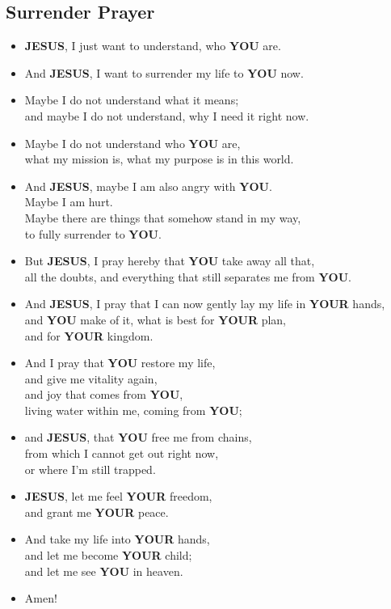 \documentclass[10pt,a5paper]{article}
\newcommand{\Jesus}[0]{\textbf{JESUS}}
\newcommand{\You}[0]{\textbf{YOU}}
\newcommand{\Your}[0]{\textbf{YOUR}}
\begin{document}
		\subsection{Surrender Prayer}
			\begin{itemize}[nosep]
				\item	{\Jesus},
						I just want to understand,
						who {\You} are.
				\item	And {\Jesus},
						I want to surrender my life to {\You} now.
				\item	Maybe I do not understand what it means;
						\\
						and maybe I do not understand,
						why I need it right now.
				\item	Maybe I do not understand who {\You} are,
						\\
						what my mission is,
						what my purpose is in this world.
				\item	And {\Jesus},
						maybe I am also angry with {\You}.
						\\
						Maybe I am hurt.
						\\
						Maybe there are things that somehow stand in my way,
						\\
						to fully surrender to {\You}.
				\item	But {\Jesus},
						I pray hereby that {\You} take away all that,
						\\
						all the doubts,
						and everything that still separates me from {\You}.
				\item	And {\Jesus},
						I pray that I can now gently lay my life in {\Your} hands,
						\\
						and {\You} make of it,
						what is best for {\Your} plan,
						\\
						and for {\Your} kingdom.
				\item	And I pray that {\You} restore my life,
						\\
						and give me vitality again,
						\\
						and joy that comes from {\You},
						\\
						living water within me,
						coming from {\You};
				\item	and {\Jesus},
						that {\You} free me from chains,
						\\
						from which I cannot get out right now,
						\\
						or where I'm still trapped.
				\item	{\Jesus},
						let me feel {\Your} freedom,
						\\
						and grant me {\Your} peace.
				\item	And take my life into {\Your} hands,
						\\
						and let me become {\Your} child;
						\\
						and let me see {\You} in heaven.
				\item	Amen!
			\end{itemize}
\end{document}
